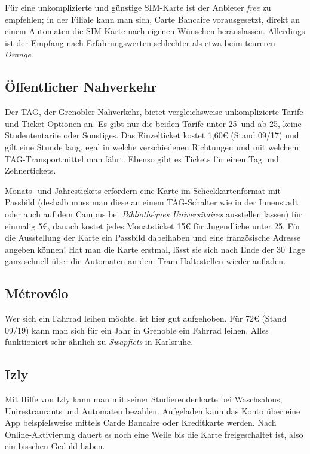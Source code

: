 \documentclass[11pt,a4paper]{article}
\begin{document}
	Für eine unkomplizierte und günstige SIM-Karte ist der Anbieter \emph{free} zu empfehlen; in der Filiale kann man sich, Carte Bancaire vorausgesetzt, direkt an einem Automaten die SIM-Karte nach eigenen Wünschen herauslassen. Allerdings ist der Empfang nach Erfahrungswerten schlechter als etwa beim teureren \emph{Orange}.
	
	\subsection{Öffentlicher Nahverkehr}
	
	Der TAG, der Grenobler Nahverkehr, bietet vergleichsweise unkomplizierte Tarife und Ticket-Optionen an. Es gibt nur die beiden Tarife \glqq unter 25\grqq\ und \glqq ab 25\grqq , keine Studententarife oder Sonstiges. Das Einzelticket kostet 1,60€ (Stand 09/17) und gilt eine Stunde lang, egal in welche verschiedenen Richtungen und mit welchem TAG-Transportmittel man fährt. Ebenso gibt es Tickets für einen Tag und Zehnertickets.
	
	Monats- und Jahrestickets erfordern eine Karte im Scheckkartenformat mit Passbild (deshalb muss man diese an einem TAG-Schalter wie in der Innenstadt oder auch auf dem Campus bei \emph{Bibliothéques Universitaires} ausstellen lassen) für einmalig 5€, danach kostet jedes Monatsticket 15€ für Jugendliche unter 25. Für die Ausstellung der Karte ein Passbild dabeihaben und eine französische Adresse angeben können! Hat man die Karte erstmal, lässt sie sich nach Ende der 30 Tage ganz schnell über die Automaten an dem Tram-Haltestellen wieder aufladen.

  \subsection{Métrovélo}
  Wer sich ein Fahrrad leihen möchte, ist hier gut aufgehoben. Für 72€ (Stand 09/19) kann man sich für ein Jahr in Grenoble ein Fahrrad leihen. Alles funktioniert sehr ähnlich zu \textit{Swapfiets} in Karlsruhe.
	
	\subsection{Izly}
  Mit Hilfe von Izly kann man mit seiner Studierendenkarte bei Waschsalons, Unirestraurants und Automaten bezahlen. Aufgeladen kann das Konto über eine App beispielsweise mittels Carde Bancaire oder Kreditkarte werden. Nach Online-Aktivierung dauert es noch eine Weile bis die Karte freigeschaltet ist, also ein bisschen Geduld haben.
\end{document}
